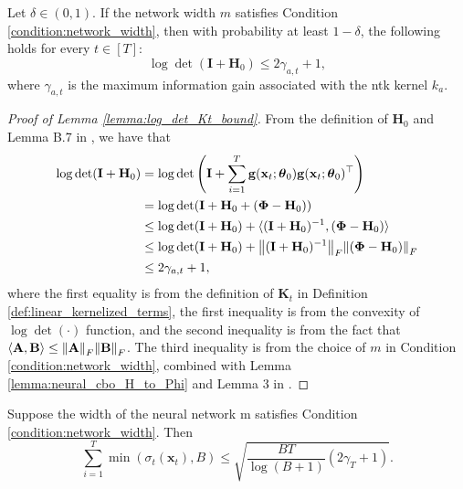 \begin{lemma}
\label{lemma:neural_cbo_log_det_Kt_bound}
Let $\delta \in (0,1)$. If the network width $m$ satisfies  Condition \ref{condition:network_width}, then with probability at least $1-\delta$, the following holds for every $t \in [T]$:
\[ \log \det (\mathbf{I} + \mathbf{H}_0) \le 2\gamma_{a,t} + 1,\]
where $\gamma_{a,t}$ is the maximum information gain associated with the \ac{ntk} kernel $k_a$.
\end{lemma}
\begin{proof}[Proof of Lemma \ref{lemma:log_det_Kt_bound}]

From the definition of $\mathbf{H}_0$ and Lemma B.7 in \citet{zhou2020neural}, we have that
\begin{equation*}
\begin{split}
    \log \det(\mathbf{I}+ \mathbf{H}_{0})
    & = \log\det \left(\mathbf{I}+\sum_{i=1}^{T}\mathbf{g}({\mathbf{x}_t};\boldsymbol{\theta}_0)\mathbf{g}({\mathbf{x}_t};\boldsymbol{\theta}_0)^\top \right) \\
    & = \log \det(\mathbf{I}+ \mathbf{H}_0 + (\boldsymbol{\Phi} - \mathbf{H}_0))\\
    & \leq \log \det (\mathbf{I}+\mathbf{H}_0)  + \langle (\mathbf{I}+\mathbf{H}_0)^{-1}, (\boldsymbol{\Phi} - \mathbf{H}_0) \rangle \\
    & \leq \log \det (\mathbf{I}+\mathbf{H}_0)  + \norm{(\mathbf{I}+\mathbf{H}_0)^{-1}}_F \norm{ (\boldsymbol{\Phi} - \mathbf{H}_0)}_F \\
    & \leq 2 \gamma_{a,t} + 1, 
\end{split}
\end{equation*}
where the first equality is from the definition of $\mathbf{K}_t$ in Definition \ref{def:linear_kernelized_terms}, the first inequality is from the convexity of $\log \det(\cdot)$ function, and the second inequality is from the fact that $\langle \mathbf{A}, \mathbf{B} \rangle \le \norm{\mathbf{A}}_F \norm{\mathbf{B}}_F$. The third inequality is from the choice of $m$ in Condition \ref{condition:network_width}, combined with Lemma \ref{lemma:neural_cbo_H_to_Phi} and Lemma 3 in \citet{chowdhury2017kernelized}.
\end{proof}

\begin{lemma}
\label{lemma:neural_cbo_min_sigma}
Suppose the width of the neural network m satisfies Condition \ref{condition:network_width}. Then 
\begin{equation*}
    \sum_{i=1}^T \min(\sigma_t(\mathbf{x}_t),B) \leq \sqrt{\frac{ BT}{\log(B+1)} (2\gamma_T+1)}.
\end{equation*}
\end{lemma}
